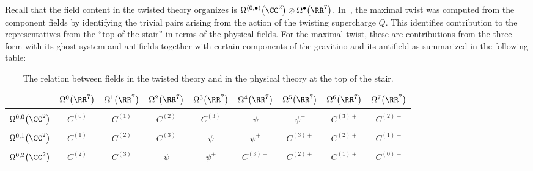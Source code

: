 \documentclass[pdftex]{sigma}
\numberwithin{equation}{section}
\theoremstyle{definition}
\begin{document}
Recall that the field content in the twisted theory organizes is $\Omega^{(0,\bullet)}\big(\CC^2\big) \otimes \Omega^\bullet\big(\RR^7\big)$. In~\cite{MaxTwist}, the maximal twist was computed from the component fields by identifying the trivial pairs arising from the action of the twisting supercharge $Q$. This identifies contribution to the representatives from the ``top of the stair'' in terms of the physical fields. For the maximal twist, these are contributions from the three-form with its ghost system and antifields together with certain components of the gravitino and its antifield as summarized in the following table:
\begin{table}[htp]
	\small
	\begin{center}
		\begin{tabular}{c|cccccccc}
			& $\Omega^0\big(\RR^7\big)$ & $\Omega^1\big(\RR^7\big)$ & $\Omega^2\big(\RR^7\big)$ & $\Omega^3\big(\RR^7\big)$ &
			$\Omega^4\big(\RR^7\big)$ & $\Omega^5\big(\RR^7\big)$ & $\Omega^6\big(\RR^7\big)$ & $\Omega^7\big(\RR^7\big)$ \\
			\hline
			\\[-0.3cm]
			$\Omega^{0,0}\big(\CC^2\big)$ & $C^{(0)}$ & $C^{(1)}$ & $C^{(2)}$ & $C^{(3)}$ & $\psi$ &
			$\psi^{+}$ & $C^{(3)+}$ & $C^{(2)+}$ \\ \\[-0.3cm]
			$\Omega^{0,1}\big(\CC^2\big)$ & $C^{(1)}$ & $C^{(2)}$ & $C^{(3)}$ & $\psi$ &
			$\psi^{+}$ & $C^{(3)+}$ & $C^{(2)+}$ & $C^{(1)+}$ \\ \\[-0.3cm]
			$\Omega^{0,2}\big(\CC^2\big)$ & $C^{(2)}$ & $C^{(3)}$ & $\psi$ & $\psi^{+}$ &
			$C^{(3)+}$ & $C^{(2)+}$ & $C^{(1)+}$ & $C^{(0)+}$ \\
		\end{tabular}
	\end{center}
	\caption{The relation between fields in the twisted theory and in the physical theory at the top of the stair.} \label{tab:twistedfields}
\end{table}
\end{document}
